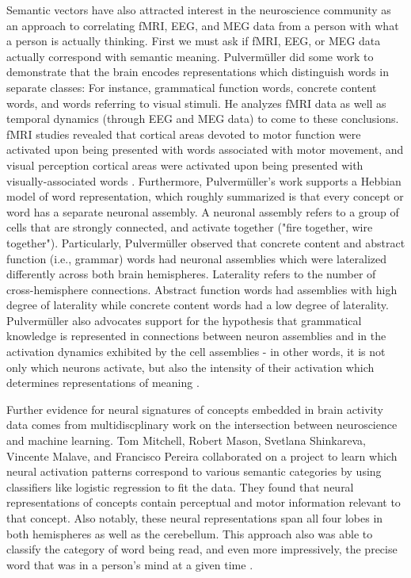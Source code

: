 \documentclass[12pt, usenames]{article}
\theoremstyle{definition}
\theoremstyle{definition}
\theoremstyle{definition}
\begin{document}
Semantic vectors have also attracted interest in the neuroscience community as an approach to correlating fMRI, EEG, and MEG data from a person with what a person is actually thinking. 
First we must ask if fMRI, EEG, or MEG data actually correspond with semantic meaning. Pulverm{\"u}ller did some work to demonstrate that the brain encodes representations which distinguish words in separate classes: For instance, grammatical function words, concrete content words, and words referring to visual stimuli. He analyzes fMRI data as well as temporal dynamics (through EEG and MEG data) to come to these conclusions. fMRI studies revealed that cortical areas devoted to motor function were activated upon being presented with words associated with motor movement, and visual perception cortical areas were activated upon being presented with visually-associated words \cite{Pulvermuller}. 
Furthermore, Pulverm{\"u}ller's work supports a Hebbian model of word representation, which roughly summarized is that every concept or word has a separate neuronal assembly. A neuronal assembly refers to a group of cells that are strongly connected, and activate together ("fire together, wire together"). Particularly, Pulverm{\"u}ller observed that concrete content and abstract function (i.e., grammar) words had neuronal assemblies which were lateralized differently across both brain hemispheres. Laterality refers to the number of cross-hemisphere connections. Abstract function words had assemblies with high degree of laterality while concrete content words had a low degree of laterality. Pulverm{\"u}ller also advocates support for the hypothesis that grammatical knowledge is represented in connections between neuron assemblies and in the activation dynamics exhibited by the cell assemblies - in other words, it is not only which neurons activate, but also the intensity of their activation which determines representations of meaning \cite{Pulvermuller}. 

Further evidence for neural signatures of concepts embedded in brain activity data comes from multidiscplinary work on the intersection between neuroscience and machine learning. Tom Mitchell, Robert Mason, Svetlana Shinkareva, Vincente Malave, and Francisco Pereira collaborated on a project to learn which neural activation patterns correspond to various semantic categories by using classifiers like logistic regression to fit the data. They found that neural representations of concepts contain perceptual and motor information relevant to that concept. Also notably, these neural representations span all four lobes in both hemispheres as well as the cerebellum. This approach also was able to classify the category of word being read, and even more impressively, the precise word that was in a person's mind at a given time \cite{Just}. 
\end{document}

